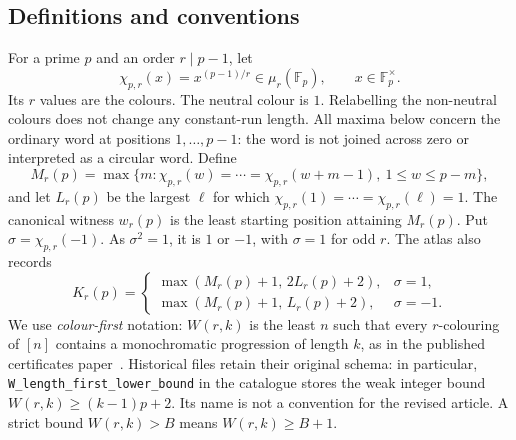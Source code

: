 \documentclass[11pt]{article}
\theoremstyle{definition}\newtheorem{definition}[theorem]{Definition}
\newcommand{\Fp}{\mathbb F_p}
\newcommand{\chr}{\chi_{p,r}}
\begin{document}
\subsection{Definitions and conventions}
For a prime $p$ and an order $r\mid p-1$, let
\[
 \chr(x)=x^{(p-1)/r}\in\mu_r(\Fp),\qquad x\in\Fp^\times.
\]
Its $r$ values are the colours. The neutral colour is $1$. Relabelling
the non-neutral colours does not change any constant-run length.
All maxima below concern the ordinary word at positions $1,\ldots,p-1$:
the word is not joined across zero or interpreted as a circular word.
Define
\[
 M_r(p)=\max\{m:\chr(w)=\cdots=\chr(w+m-1),\
                  1\le w\le p-m\},
\]
and let $L_r(p)$ be the largest $\ell$ for which
$\chr(1)=\cdots=\chr(\ell)=1$. The canonical witness $w_r(p)$ is the
least starting position attaining $M_r(p)$. Put $\sigma=\chr(-1)$.
As $\sigma^2=1$, it is $1$ or $-1$, with $\sigma=1$ for odd $r$.
The atlas also records
\begin{equation}\label{eq:K}
 K_r(p)=
 \begin{cases}
  \max(M_r(p)+1,\,2L_r(p)+2),&\sigma=1,\\
  \max(M_r(p)+1,\,L_r(p)+2),&\sigma=-1.
 \end{cases}
\end{equation}
We use \emph{colour-first} notation: $W(r,k)$ is the least $n$ such that
every $r$-colouring of $[n]$ contains a monochromatic progression of
length $k$, as in the published certificates paper~\cite{boundsv2}.
Historical files retain their original schema: in particular,
\texttt{W\_length\_first\_lower\_bound} in the catalogue stores the weak
integer bound $W(r,k)\ge(k-1)p+2$. Its name is not a convention for
the revised article. A strict bound $W(r,k)>B$ means $W(r,k)\ge B+1$.
\end{document}
